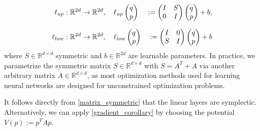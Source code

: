 \documentclass[twoside,a4paper]{article}
\begin{document}
\begin{alignat*}{2}
	\ell_{up}&: \mathbb{R}^{2d} \to \mathbb{R}^{2d}, \quad \ell_{up} \begin{pmatrix} q \\ p \end{pmatrix} &:= \begin{pmatrix}
		I & S \\
		0 & I
	\end{pmatrix} \begin{pmatrix} q \\ p \end{pmatrix} + b, \\[7pt]
	\ell_{low}&: \mathbb{R}^{2d} \to \mathbb{R}^{2d}, \quad \ell_{low} \begin{pmatrix} q \\ p \end{pmatrix} &:= \begin{pmatrix}
		I & 0 \\
		S & I
	\end{pmatrix} \begin{pmatrix} q \\ p \end{pmatrix} + b
\end{alignat*}
where $S \in \mathbb{R}^{d \times d}$ symmetric and $b \in \mathbb{R}^{2d}$
are learnable parameters. In practice, we parametrize the symmetric matrix $S\in \mathbb{R}^{d \times d}$
with $S = A^T + A$ via another arbitrary matrix $A\in \mathbb{R}^{d \times d}$, as
most optimization methods used for learning neural networks are designed for
unconstrained optimization problems.

It follows directly from \cref{matrix_symmetric} that the linear layers are
symplectic. Alternatively, we can apply \cref{gradient_corollary} by
choosing the potential $V(p) := p^TAp$.
\end{document}
